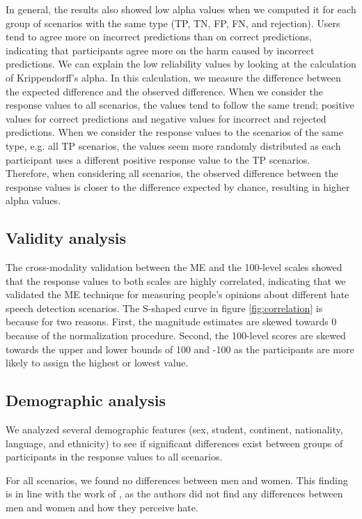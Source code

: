 %
In general, the results also showed low alpha values when we computed it for each group of scenarios with the same type (TP, TN, FP, FN, and rejection).
%
Users tend to agree more on incorrect predictions than on correct predictions, indicating that participants agree more on the harm caused by incorrect predictions.
%
We can explain the low reliability values by looking at the calculation of Krippendorff's alpha.
%
In this calculation, we measure the difference between the expected difference and the observed difference.
%
When we consider the response values to all scenarios, the values tend to follow the same trend; positive values for correct predictions and negative values for incorrect and rejected predictions.
%
When we consider the response values to the scenarios of the same type, e.g. all TP scenarios, the values seem more randomly distributed as each participant uses a different positive response value to the TP scenarios.
%
Therefore, when considering all scenarios, the observed difference between the response values is closer to the difference expected by chance, resulting in higher alpha values.
%

\subsection{Validity analysis}
\label{sec:discussion-validity}
The cross-modality validation between the ME and the 100-level scales showed that the response values to both scales are highly correlated, indicating that we validated the ME technique for measuring people's opinions about different hate speech detection scenarios.
%
The S-shaped curve in figure \ref{fig:correlation} is because for two reasons.
%
First, the magnitude estimates are skewed towards 0 because of the normalization procedure.
%
Second, the 100-level scores are skewed towards the upper and lower bounds of 100 and -100 as the participants are more likely to assign the highest or lowest value.

\subsection{Demographic analysis}
\label{sec:discussion-demographic}
We analyzed several demographic features (sex, student, continent, nationality, language, and ethnicity) to see if significant differences exist between groups of participants in the response values to all scenarios.
%

%
For all scenarios, we found no differences between men and women.
%
This finding is in line with the work of \citet{gold2018women}, as the authors did not find any differences between men and women and how they perceive hate.
%


